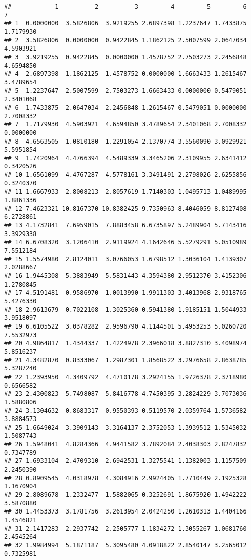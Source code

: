 \documentclass[
]{article}
\begin{document}
\begin{verbatim}
##            1          2          3         4         5         6         7
## 1  0.0000000  3.5826806  3.9219255 2.6897398 1.2237647 1.7433875 1.7179930
## 2  3.5826806  0.0000000  0.9422845 1.1862125 2.5007599 2.0647034 4.5903921
## 3  3.9219255  0.9422845  0.0000000 1.4578752 2.7503273 2.2456848 4.6594850
## 4  2.6897398  1.1862125  1.4578752 0.0000000 1.6663433 1.2615467 3.4789654
## 5  1.2237647  2.5007599  2.7503273 1.6663433 0.0000000 0.5479051 2.3401068
## 6  1.7433875  2.0647034  2.2456848 1.2615467 0.5479051 0.0000000 2.7008332
## 7  1.7179930  4.5903921  4.6594850 3.4789654 2.3401068 2.7008332 0.0000000
## 8  4.6563505  1.0810180  1.2291054 2.1370774 3.5560090 3.0929921 5.5951854
## 9  1.7420964  4.4766394  4.5489339 3.3465206 2.3109955 2.6341412 0.3420526
## 10 1.6561099  4.4767287  4.5778161 3.3491491 2.2798026 2.6255856 0.3240370
## 11 1.6667933  2.8008213  2.8057619 1.7140303 1.0495713 1.0489995 1.8861336
## 12 7.4623321 10.8167370 10.8382425 9.7350963 8.4046059 8.8127408 6.2728861
## 13 4.1732841  7.6959015  7.8883458 6.6735897 5.2489904 5.7143416 3.3929338
## 14 6.6708320  3.1206410  2.9119924 4.1642646 5.5279291 5.0510989 7.5512184
## 15 1.5574980  2.8124011  3.0766053 1.6798512 1.3036104 1.4139307 2.0288667
## 16 1.9445308  5.3883949  5.5831443 4.3594380 2.9512370 3.4152306 1.2780845
## 17 4.5191481  0.9586970  1.0013990 1.9911303 3.4013968 2.9318765 5.4276330
## 18 2.9613679  0.7022108  1.3025360 0.5941380 1.9185151 1.5044933 3.9518097
## 19 6.6105522  3.0378282  2.9596790 4.1144501 5.4953253 5.0260720 7.5532973
## 20 4.9864817  1.4344337  1.4224978 2.3966018 3.8827310 3.4098974 5.8516237
## 21 4.3482870  0.8333067  1.2987301 1.8568522 3.2976658 2.8638785 5.3287240
## 22 1.2393950  4.3409792  4.4710178 3.2924155 1.9726378 2.3718980 0.6566582
## 23 2.4300823  5.7498087  5.8416778 4.7450395 3.2824229 3.7073036 1.5880806
## 24 3.1304632  0.8683317  0.9550393 0.5119570 2.0359764 1.5736582 3.8884573
## 25 1.6649024  3.3909143  3.3164137 2.3752053 1.3939512 1.5345032 1.5087743
## 26 1.5948041  4.8284366  4.9441582 3.7892084 2.4038303 2.8247832 0.7347789
## 27 1.6933104  2.4709310  2.6942531 1.3275541 1.1382003 1.1157509 2.2450390
## 28 0.8909545  4.0318978  4.3084916 2.9924405 1.7710449 2.1925328 1.1670904
## 29 2.8089678  1.2332477  1.5882065 0.3252691 1.8675920 1.4942222 3.5870880
## 30 1.4453373  3.1781756  3.2613954 2.0424250 1.2610313 1.4404166 1.4546821
## 31 2.1417283  2.2937742  2.2505777 1.1834272 1.3055267 1.0681760 2.4545264
## 32 1.9984994  5.1871187  5.3095480 4.0918822 2.8540147 3.2565012 0.7325981

\end{verbatim}
\end{document}
